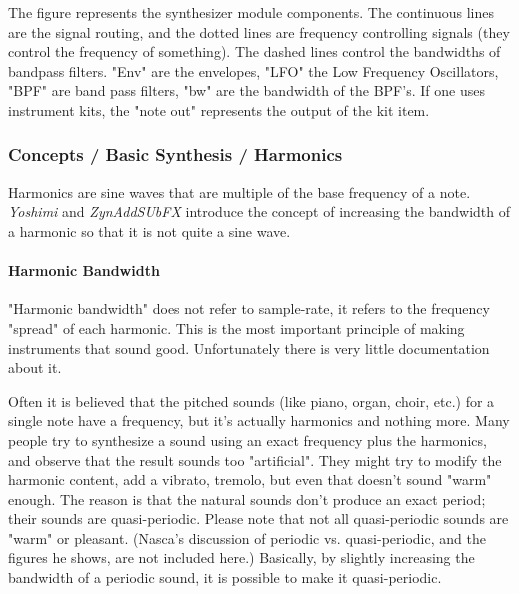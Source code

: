    The figure represents the synthesizer module components. The continuous
   lines are the signal routing, and the dotted lines are frequency
   controlling signals (they control the frequency of something).  The
   dashed lines control the bandwidths of bandpass filters. "Env" are the
   envelopes, "LFO" the Low Frequency Oscillators, "BPF" are band pass
   filters, "bw" are the bandwidth of the BPF's.  If one uses instrument kits,
   the "note out" represents the output of the kit item.

\subsubsection{Concepts / Basic Synthesis / Harmonics}
\label{subsubsec:concepts_basics_harmonics}

   Harmonics are sine waves that are multiple of the base frequency of a
   note.  \textsl{Yoshimi} and \textsl{ZynAddSUbFX} introduce the concept of
   increasing the bandwidth of a harmonic so that it is not quite a sine
   wave.

\paragraph{Harmonic Bandwidth}
\label{paragraph:concepts_basics_harmonic_bandwidth}

   "Harmonic bandwidth" does not refer to sample-rate, it refers to the
   frequency "spread" of each harmonic. This is the most important principle
   of making instruments that sound good. Unfortunately there is very little
   documentation about it.
    
   Often it is believed that the pitched sounds (like piano, organ, choir,
   etc.) for a single note have a frequency, but it's actually
   harmonics and nothing more. Many people try to synthesize a sound using an
   exact frequency plus the harmonics, and observe that the result sounds too
   "artificial".  They might try to modify the harmonic content, add a
   vibrato, tremolo, but even that doesn't sound "warm" enough. The reason is
   that the natural sounds don't produce an exact period; their sounds are
   quasi-periodic.  Please note that not all quasi-periodic sounds are
   "warm" or pleasant.
   (Nasca's discussion of periodic vs. quasi-periodic,
   and the figures he shows, are not included here.)
   Basically, by slightly increasing the bandwidth of a periodic sound, it
   is possible to make it quasi-periodic.

